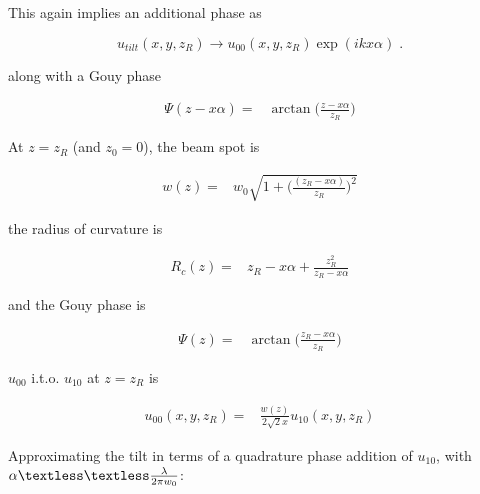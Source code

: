 \documentclass[aps,twoside,secnumarabic,balancelastpage,amsmath,amssymb,nofootinbib,hyperref=pdftex]{revtex4}
\begin{document}
This again implies an additional phase as
	
	\begin{equation} 
		u_{tilt}(x,y,z_R) \rightarrow 
		u_{00}(x,y,z_R) \exp(ikx\alpha)\;.
	\end{equation}


along with a Gouy phase

\begin{align*}
\Psi(z-x\alpha)
 =& \arctan\Big( \frac{ z-x\alpha}{z_R} \Big)
\end{align*}

At $z = z_R$ (and $z_0=0$), the beam spot is 

\begin{align*}
w(z)
 =& 
 w_0 \sqrt{1 + \big( \frac{ (z_R-x\alpha)}{z_R} \big)^2}
\end{align*}

the radius of curvature is 

\begin{align*}
	R_c (z) =& 
	z_R-x\alpha + \frac{z_R^2}{z_R-x\alpha}
\end{align*}

and the Gouy phase is 

\begin{align*}
\Psi(z)
 =& \arctan\Big( \frac{z_R-x\alpha}{z_R} \Big)
\end{align*}

$u_{00}$ i.t.o. $u_{10}$ at $z=z_R$ is 

\begin{align*}
u_{00}(x,y,z_R) =&
 	\frac{w(z)}{2\sqrt{2} x} 
 u_{10}(x,y,z_R)  
\end{align*}

Approximating the tilt in terms of a quadrature phase addition of $u_{10}$, with $\alpha \textless\textless \frac{\lambda}{2\pi w_{0}}$:
	
\end{document}
